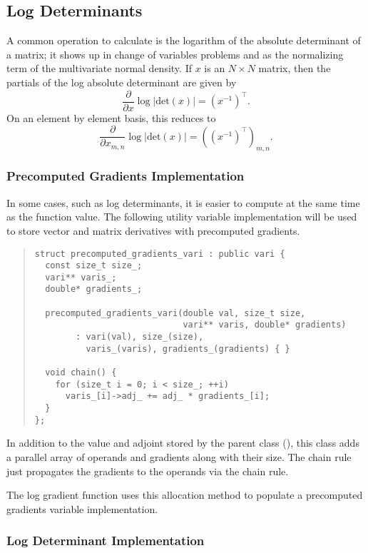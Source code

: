 \documentclass[10pt]{article}
\begin{document}
\subsection{Log Determinants}

A common operation to calculate is the logarithm of the absolute
determinant of a matrix; it shows up in change of variables problems
and as the normalizing term of the multivariate normal density.  If
$x$ is an $N \times N$ matrix, then the partials of the log absolute
determinant are given by
\[
\frac{\partial}{\partial x} \log | \mbox{det}(x) |
= \left( x^{-1} \right)^{\top}.
\]
On an element by element basis, this reduces to
\[
\frac{\partial}{\partial x_{m,n}} \log | \mbox{det}(x) |
= \left( \left( x^{-1} \right)^{\top}\right)_{m,n}.
\]

\subsubsection{Precomputed Gradients Implementation}

In some cases, such as log determinants, it is easier to compute at
the same time as the function value.  The following utility variable
implementation will be used to store vector and matrix derivatives
with precomputed gradients.
%
\begin{quote}
\begin{Verbatim}
struct precomputed_gradients_vari : public vari {
  const size_t size_;
  vari** varis_;
  double* gradients_;

  precomputed_gradients_vari(double val, size_t size, 
                             vari** varis, double* gradients)
        : vari(val), size_(size),
          varis_(varis), gradients_(gradients) { }

  void chain() {
    for (size_t i = 0; i < size_; ++i) 
      varis_[i]->adj_ += adj_ * gradients_[i];
  }
};
\end{Verbatim}
\end{quote}
%
In addition to the value and adjoint stored by the parent class
(), this class adds a parallel array of operands and
gradients along with their size.  The chain rule just propagates the
gradients to the operands via the chain rule.

The log gradient function uses this allocation method to populate a
precomputed gradients variable implementation.


\subsubsection{Log Determinant Implementation}
\end{document}

